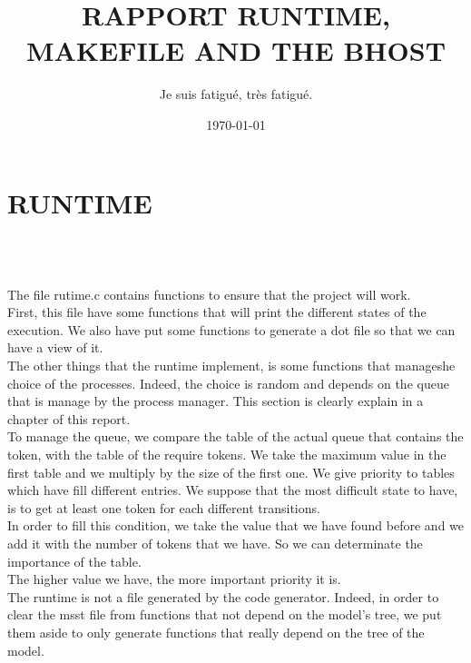 \documentclass[a4paper,oneside,12pt]{article}
\title{RAPPORT RUNTIME, MAKEFILE AND THE BHOST}
\author{Je suis fatigué, très fatigué.}
\date\today
\begin{document}
\maketitle

\newpage

\tableofcontents

\newpage


\section{RUNTIME}
\textbf{\\\\}

   The file rutime.c contains functions to ensure that the project will
work.\\

   First, this file have some functions that will print the different states of the execution. We also have put some functions to generate a dot file so that we can have a view of it.\\

   The other things that the runtime implement, is some functions that manageshe choice of the processes. Indeed, the choice is random and depends on the queue that is manage by the process manager. This section is clearly explain in a chapter of this report.\\

   To manage the queue, we compare the table of the actual queue that contains the token, with the table of the require tokens. We take the maximum value in the first table and we multiply by the size of the first one. We give priority to tables which have fill different entries. We suppose that the most difficult state to have, is to get at least one token for each different transitions.\\

   In order to fill this condition, we take the value that we have found before and we add it with the number of tokens that we have. So we can determinate the importance of the table.\\

   The higher value we have, the more important priority it is.\\

   The runtime is not a file generated by the code generator. Indeed, in order to clear the msst file from functions that not depend on the model's tree, we put them aside to only generate functions that really depend on the tree of the model.\\\\
\end{document}
